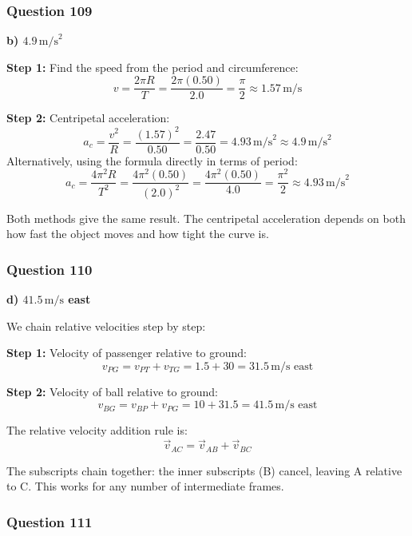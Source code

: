 \documentclass[12pt,letterpaper]{article}
\begin{document}
\subsubsection*{Question 109}

\begin{answerbox}
\textbf{b) $4.9\,\text{m/s}^2$}
\end{answerbox}

\begin{explanationbox}
\textbf{Step 1:} Find the speed from the period and circumference:
\[
v = \frac{2\pi R}{T} = \frac{2\pi(0.50)}{2.0} = \frac{\pi}{2} \approx 1.57\,\text{m/s}
\]

\textbf{Step 2:} Centripetal acceleration:
\[
a_c = \frac{v^2}{R} = \frac{(1.57)^2}{0.50} = \frac{2.47}{0.50} = 4.93\,\text{m/s}^2 \approx 4.9\,\text{m/s}^2
\]
Alternatively, using the formula directly in terms of period:
\[
a_c = \frac{4\pi^2 R}{T^2} = \frac{4\pi^2(0.50)}{(2.0)^2} = \frac{4\pi^2(0.50)}{4.0} = \frac{\pi^2}{2} \approx 4.93\,\text{m/s}^2
\]

Both methods give the same result. The centripetal acceleration depends on both how fast the object moves and how tight the curve is.
\end{explanationbox}

\subsubsection*{Question 110}

\begin{answerbox}
\textbf{d) $41.5\,\text{m/s}$ east}
\end{answerbox}

\begin{explanationbox}
We chain relative velocities step by step:

\textbf{Step 1:} Velocity of passenger relative to ground:
\[
v_{PG} = v_{PT} + v_{TG} = 1.5 + 30 = 31.5\,\text{m/s east}
\]

\textbf{Step 2:} Velocity of ball relative to ground:
\[
v_{BG} = v_{BP} + v_{PG} = 10 + 31.5 = 41.5\,\text{m/s east}
\]

The relative velocity addition rule is:
\[
\vec{v}_{AC} = \vec{v}_{AB} + \vec{v}_{BC}
\]

The subscripts chain together: the inner subscripts (B) cancel, leaving A relative to C. This works for any number of intermediate frames.
\end{explanationbox}

\subsubsection*{Question 111}
\end{document}
